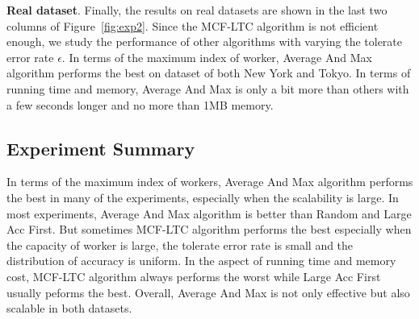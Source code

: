\textbf{Real dataset}.
Finally, the results on real datasets are shown in the last two columns of Figure~\ref{fig:exp2}.
Since the MCF-LTC algorithm is not efficient enough, we study the performance of other algorithms with varying the tolerate error rate $\epsilon$.
In terms of the maximum index of worker, Average And Max algorithm performs the best on dataset of both New York and Tokyo.
In terms of running time and memory, Average And Max is only a bit more than others 
with a few seconds longer and no more than 1MB memory.

\subsection{Experiment Summary}
In terms of the maximum index of workers, 
Average And Max algorithm performs the best in many of the experiments, especially when the scalability is large.
In most experiments, Average And Max algorithm is better than Random and Large Acc First.
But sometimes MCF-LTC algorithm performs the best especially when the capacity of worker is large, the tolerate error rate is small and the distribution of accuracy is uniform.
In the aspect of running time and memory cost, MCF-LTC algorithm always performs the worst while Large Acc First usually peforms the best.
Overall, Average And Max is not only effective but also scalable in both datasets.
